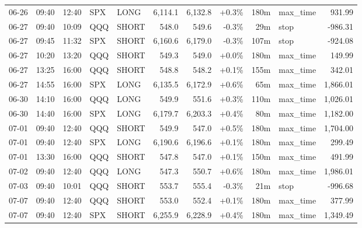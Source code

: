 \documentclass[11pt,a4paper,twoside]{article}
\begin{document}
\begin{center}
\begin{longtable}{>{\color{txtmain}}l l l l l r r r r >{\color{txtmain}}l r}
06-26 & 09:40 & 12:40 & SPX & LONG & 6,114.1 & 6,132.8 & \textcolor{wingreen}{+0.3\%} & 180m & max\_time & \textcolor{wingreen}{931.99} \\
06-27 & 09:40 & 10:09 & QQQ & SHORT & 548.0 & 549.6 & \textcolor{lossred}{-0.3\%} & 29m & stop & \textcolor{lossred}{-986.31} \\
06-27 & 09:45 & 11:32 & SPX & SHORT & 6,160.6 & 6,179.0 & \textcolor{lossred}{-0.3\%} & 107m & stop & \textcolor{lossred}{-924.08} \\
06-27 & 10:20 & 13:20 & QQQ & SHORT & 549.3 & 549.0 & \textcolor{wingreen}{+0.0\%} & 180m & max\_time & \textcolor{wingreen}{149.99} \\
06-27 & 13:25 & 16:00 & QQQ & SHORT & 548.8 & 548.2 & \textcolor{wingreen}{+0.1\%} & 155m & max\_time & \textcolor{wingreen}{342.01} \\
06-27 & 14:55 & 16:00 & SPX & LONG & 6,135.5 & 6,172.9 & \textcolor{wingreen}{+0.6\%} & 65m & max\_time & \textcolor{wingreen}{1,866.01} \\
06-30 & 14:10 & 16:00 & QQQ & LONG & 549.9 & 551.6 & \textcolor{wingreen}{+0.3\%} & 110m & max\_time & \textcolor{wingreen}{1,026.01} \\
06-30 & 14:40 & 16:00 & SPX & LONG & 6,179.7 & 6,203.3 & \textcolor{wingreen}{+0.4\%} & 80m & max\_time & \textcolor{wingreen}{1,182.00} \\
07-01 & 09:40 & 12:40 & QQQ & SHORT & 549.9 & 547.0 & \textcolor{wingreen}{+0.5\%} & 180m & max\_time & \textcolor{wingreen}{1,704.00} \\
07-01 & 09:40 & 12:40 & SPX & LONG & 6,190.6 & 6,196.6 & \textcolor{wingreen}{+0.1\%} & 180m & max\_time & \textcolor{wingreen}{299.49} \\
07-01 & 13:30 & 16:00 & QQQ & SHORT & 547.8 & 547.0 & \textcolor{wingreen}{+0.1\%} & 150m & max\_time & \textcolor{wingreen}{491.99} \\
07-02 & 09:40 & 12:40 & QQQ & LONG & 547.3 & 550.7 & \textcolor{wingreen}{+0.6\%} & 180m & max\_time & \textcolor{wingreen}{1,986.01} \\
07-03 & 09:40 & 10:01 & QQQ & SHORT & 553.7 & 555.4 & \textcolor{lossred}{-0.3\%} & 21m & stop & \textcolor{lossred}{-996.68} \\
07-07 & 09:40 & 12:40 & QQQ & SHORT & 553.0 & 552.4 & \textcolor{wingreen}{+0.1\%} & 180m & max\_time & \textcolor{wingreen}{377.99} \\
07-07 & 09:40 & 12:40 & SPX & SHORT & 6,255.9 & 6,228.9 & \textcolor{wingreen}{+0.4\%} & 180m & max\_time & \textcolor{wingreen}{1,349.49} \\

\end{longtable}
\end{center}
\end{document}

